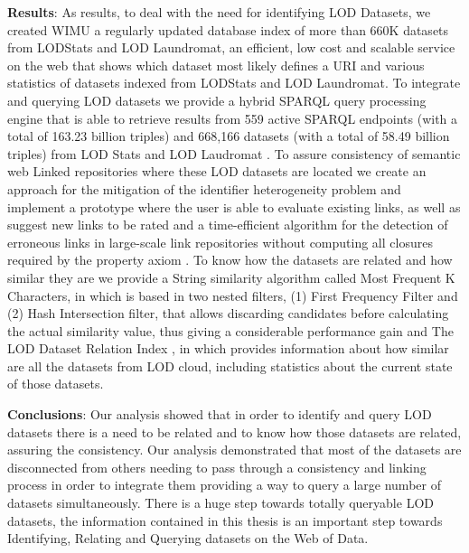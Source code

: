 \textbf{Results}:
As results, to deal with the need for identifying LOD Datasets, we created WIMU\cite{valdestilhas2018my} a regularly updated database index of more than 660K datasets from LODStats and LOD Laundromat, an efficient, low cost and scalable service on the web that shows which dataset most likely defines a URI and various statistics of datasets indexed from LODStats and LOD Laundromat. To integrate and querying LOD datasets we provide a hybrid SPARQL query processing engine that is able to retrieve results from 559 active SPARQL endpoints (with a total of 163.23 billion triples) and 668,166 datasets (with a total of 58.49 billion triples) from LOD Stats and LOD Laudromat \cite{ValdestilhasKcap}. To assure consistency of semantic web Linked repositories where these LOD datasets are located we create an approach for the mitigation of the identifier heterogeneity problem and implement a prototype where the user is able to evaluate existing links, as well as suggest new links to be rated and a time-efficient algorithm for the detection of erroneous links in large-scale link repositories without computing all closures required by the property axiom \cite{valdestilhasdbpediasameas, valdestilhas2017cedal}. To  know how the datasets are related and how similar they are we provide a String similarity algorithm called Most Frequent K Characters, in which is based in two nested filters, (1) First Frequency Filter and (2) Hash Intersection filter, that allows discarding candidates before calculating the actual similarity value, thus giving a considerable performance gain \cite{valdestilhas2017high} and The LOD Dataset Relation Index \cite{valdestilhasSWJ2020}, in which provides information about how similar are all the datasets from LOD cloud, including statistics about the current state of those datasets.

\textbf{Conclusions}:
Our analysis showed that in order to identify and query LOD datasets there is a need to be related and to know how those datasets are related, assuring the consistency. Our analysis demonstrated that most of the datasets are disconnected from others needing to pass through a consistency and linking process in order to integrate them providing a way to query a large number of datasets simultaneously. There is a huge step towards totally queryable LOD datasets, the information contained in this thesis is an important step towards Identifying, Relating and Querying datasets on the Web of Data.
